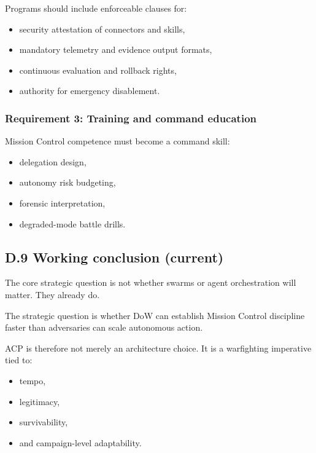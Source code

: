 \documentclass[
]{article}
\providecommand{\tightlist}{%
  \setlength{\itemsep}{0pt}\setlength{\parskip}{0pt}}
\begin{document}
Programs should include enforceable clauses for:

\begin{itemize}
\tightlist
\item
  security attestation of connectors and skills,
\item
  mandatory telemetry and evidence output formats,
\item
  continuous evaluation and rollback rights,
\item
  authority for emergency disablement.
\end{itemize}

\hypertarget{requirement-3-training-and-command-education}{%
\subsubsection{Requirement 3: Training and command
education}\label{requirement-3-training-and-command-education}}

Mission Control competence must become a command skill:

\begin{itemize}
\tightlist
\item
  delegation design,
\item
  autonomy risk budgeting,
\item
  forensic interpretation,
\item
  degraded-mode battle drills.
\end{itemize}

\hypertarget{d.9-working-conclusion-current}{%
\subsection{D.9 Working conclusion
(current)}\label{d.9-working-conclusion-current}}

The core strategic question is not whether swarms or agent orchestration
will matter. They already do.

The strategic question is whether DoW can establish Mission Control
discipline faster than adversaries can scale autonomous action.

ACP is therefore not merely an architecture choice. It is a warfighting
imperative tied to:

\begin{itemize}
\tightlist
\item
  tempo,
\item
  legitimacy,
\item
  survivability,
\item
  and campaign-level adaptability.
\end{itemize}
\end{document}
